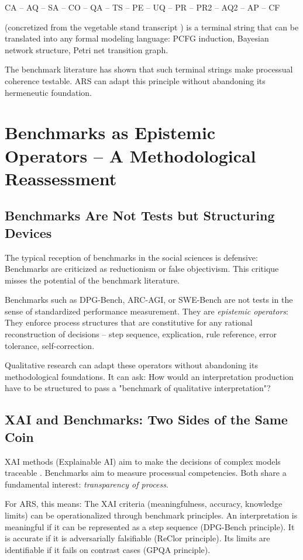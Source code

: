 \documentclass[12pt,a4paper]{article}
\begin{document}
CA – AQ – SA – CO – QA – TS – PE – UQ – PR – PR2 – AQ2 – AP – CF

(concretized from the vegetable stand transcript \cite{koop2024cfti}) is a terminal string that can be translated into any formal modeling language: PCFG induction, Bayesian network structure, Petri net transition graph.

The benchmark literature has shown that such terminal strings make processual coherence testable. ARS can adapt this principle without abandoning its hermeneutic foundation.

\section{Benchmarks as Epistemic Operators – A Methodological Reassessment}

\subsection{Benchmarks Are Not Tests but Structuring Devices}

The typical reception of benchmarks in the social sciences is defensive: Benchmarks are criticized as reductionism or false objectivism. This critique misses the potential of the benchmark literature.

Benchmarks such as DPG-Bench, ARC-AGI, or SWE-Bench are not tests in the sense of standardized performance measurement. They are \textit{epistemic operators}: They enforce process structures that are constitutive for any rational reconstruction of decisions – step sequence, explication, rule reference, error tolerance, self-correction.

Qualitative research can adapt these operators without abandoning its methodological foundations. It can ask: How would an interpretation production have to be structured to pass a "benchmark of qualitative interpretation"?

\subsection{XAI and Benchmarks: Two Sides of the Same Coin}

XAI methods (Explainable AI) aim to make the decisions of complex models traceable \cite{barredo2020xai}. Benchmarks aim to measure processual competencies. Both share a fundamental interest: \textit{transparency of process}.

For ARS, this means: The XAI criteria (meaningfulness, accuracy, knowledge limits) \cite{ortigossa2024xai} can be operationalized through benchmark principles. An interpretation is meaningful if it can be represented as a step sequence (DPG-Bench principle). It is accurate if it is adversarially falsifiable (ReClor principle). Its limits are identifiable if it fails on contrast cases (GPQA principle).
\end{document}

